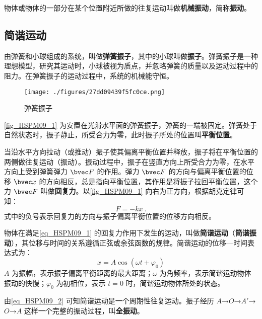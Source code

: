 

物体或物体的一部分在某个位置附近所做的往复运动叫做\textbf{机械振动}，简称\textbf{振动}。

\subsection{简谐运动}

由弹簧和小球组成的系统，叫做\textbf{弹簧振子}，其中的小球叫做\textbf{振子}。弹簧振子是一种理想模型，研究其运动时，小球被视为质点，并忽略弹簧的质量以及运动过程中的阻力。在弹簧振子的运动过程中，系统的机械能守恒。

\begin{figure}[ht]
\centering
\texttt{[image: ./figures/27dd09439f5fc0ce.png]}
\caption{弹簧振子} \label{fig_HSPM09_1}
\end{figure}

\autoref{fig_HSPM09_1} 为安置在光滑水平面的弹簧振子，弹簧的一端被固定。弹簧处于自然状态时，振子静止，所受合力为零，此时振子所处的位置叫\textbf{平衡位置}。

当沿水平方向拉动（或推动）振子使其偏离平衡位置并释放，振子将在平衡位置的两侧做往复运动（振动）。振动过程中，振子在竖直方向上所受合力为零，在水平方向上受到弹簧弹力 $\bvec F$ 的作用。弹力 $\bvec F$ 的方向与偏离平衡位置的位移 $\bvec x$ 的方向相反，总是指向平衡位置，其作用是将振子拉回平衡位置，这个力 $\bvec F$ 叫做\textbf{回复力}。以\autoref{fig_HSPM09_1} 向右为正方向，根据胡克定律可知：
\begin{equation}\label{eq_HSPM09_1}
F=-kx~.
\end{equation}
式中的负号表示回复力的方向与振子偏离平衡位置的位移方向相反。

物体在满足\autoref{eq_HSPM09_1} 的回复力作用下发生的运动，叫做\textbf{简谐运动}（\textbf{简谐振动}），其位移与时间的关系遵循正弦或余弦函数的规律。简谐运动的位移—时间表达式为：
\begin{equation}\label{eq_HSPM09_2}
x=A\cos(\omega t + \varphi_0)
\end{equation}
$A$ 为振幅，表示振子偏离平衡距离的最大距离；$\omega$ 为角频率，表示简谐运动物体振动的快慢；$\varphi_0$ 为初相位，表示 $t=0$ 时，简谐运动物体所处的状态。

由\autoref{eq_HSPM09_2} 可知简谐运动是一个周期性往复运动。振子经历 $A$→$O$→$A'$→$O$→$A$ 这样一个完整的振动过程，叫\textbf{全振动}。

